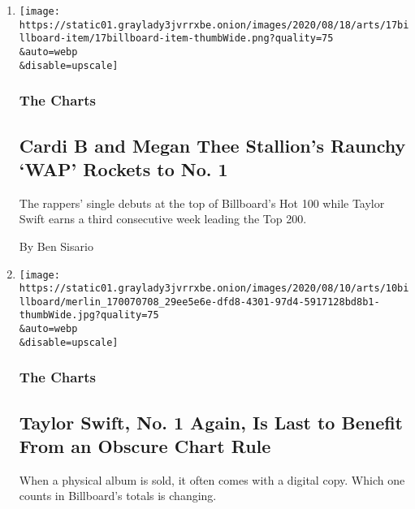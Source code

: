\begin{enumerate}
\def\labelenumi{\arabic{enumi}.}
\item
  \href{/2020/08/17/arts/music/cardi-b-wap-billboard.html}{}

  \texttt{[image: https://static01.graylady3jvrrxbe.onion/images/2020/08/18/arts/17billboard-item/17billboard-item-thumbWide.png?quality=75\\\&auto=webp\\\&disable=upscale]}

  \hypertarget{the-charts}{%
  \subsubsection{The Charts}\label{the-charts}}

  \hypertarget{cardi-b-and-megan-thee-stallions-raunchy-wap-rockets-to-no-1}{%
  \subsection{Cardi B and Megan Thee Stallion's Raunchy `WAP' Rockets to
  No.
  1}\label{cardi-b-and-megan-thee-stallions-raunchy-wap-rockets-to-no-1}}

  The rappers' single debuts at the top of Billboard's Hot 100 while
  Taylor Swift earns a third consecutive week leading the Top 200.

  By Ben Sisario
\item
  \href{/2020/08/10/arts/music/taylor-swift-folklore-billboard.html}{}

  \texttt{[image: https://static01.graylady3jvrrxbe.onion/images/2020/08/10/arts/10billboard/merlin\_170070708\_29ee5e6e-dfd8-4301-97d4-5917128bd8b1-thumbWide.jpg?quality=75\\\&auto=webp\\\&disable=upscale]}

  \hypertarget{the-charts-1}{%
  \subsubsection{The Charts}\label{the-charts-1}}

  \hypertarget{taylor-swift-no-1-again-is-last-to-benefit-from-an-obscure-chart-rule}{%
  \subsection{Taylor Swift, No. 1 Again, Is Last to Benefit From an
  Obscure Chart
  Rule}\label{taylor-swift-no-1-again-is-last-to-benefit-from-an-obscure-chart-rule}}

  When a physical album is sold, it often comes with a digital copy.
  Which one counts in Billboard's totals is changing.


\end{enumerate}
